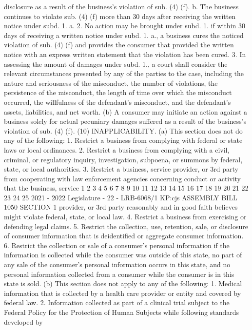 disclosure as a result of the business's violation of sub. (4) (f).
b. The business continues to violate sub. (4) (f) more than 30 days after
receiving the written notice under subd. 1. a.
2. No action may be brought under subd. 1. if within 30 days of receiving a
written notice under subd. 1. a., a business cures the noticed violation of sub. (4) (f)
and provides the consumer that provided the written notice with an express written
statement that the violation has been cured.
3. In assessing the amount of damages under subd. 1., a court shall consider
the relevant circumstances presented by any of the parties to the case, including the
nature and seriousness of the misconduct, the number of violations, the persistence
of the misconduct, the length of time over which the misconduct occurred, the
willfulness of the defendant's misconduct, and the defendant's assets, liabilities, and
net worth.
(b) A consumer may initiate an action against a business solely for actual
pecuniary damages suffered as a result of the business's violation of sub. (4) (f).
(10) INAPPLICABILITY. (a) This section does not do any of the following:
1. Restrict a business from complying with federal or state laws or local
ordinances.
2. Restrict a business from complying with a civil, criminal, or regulatory
inquiry, investigation, subpoena, or summons by federal, state, or local authorities.
3. Restrict a business, service provider, or 3rd party from cooperating with law
enforcement agencies concerning conduct or activity that the business, service
1
2
3
4
5
6
7
8
9
10
11
12
13
14
15
16
17
18
19
20
21
22
23
24
25
2021 - 2022 Legislature - 22 - LRB-6068/1
KP:cjs
 ASSEMBLY BILL 1050 SECTION 1
provider, or 3rd party reasonably and in good faith believes might violate federal,
state, or local law.
4. Restrict a business from exercising or defending legal claims.
5. Restrict the collection, use, retention, sale, or disclosure of consumer
information that is deidentified or aggregate consumer information.
6. Restrict the collection or sale of a consumer's personal information if the
information is collected while the consumer was outside of this state, no part of any
sale of the consumer's personal information occurs in this state, and no personal
information collected from a consumer while the consumer is in this state is sold.
(b) This section does not apply to any of the following:
1. Medical information that is collected by a health care provider or entity and
covered by federal law.
2. Information collected as part of a clinical trial subject to the Federal Policy
for the Protection of Human Subjects while following standards developed by
